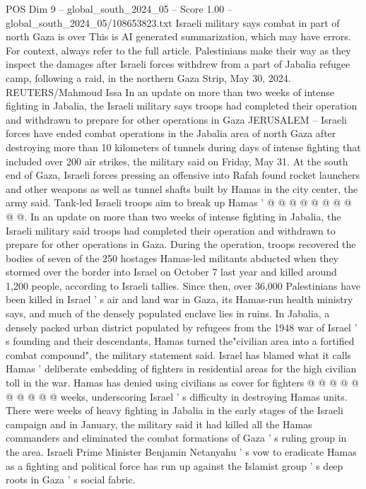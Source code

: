 \begin{textsample}{POS Dim 9 – global\_south\_2024\_05 – Score 1.00 – global\_south\_2024\_05/108653823.txt}  \label{ex:f9_pos_122}
Israeli military says combat in part of north Gaza is over This is AI generated summarization, which may have errors.
For context, always refer to the full article.
Palestinians make their way as they inspect the damages after Israeli forces withdrew from a part of Jabalia refugee camp, following a raid, in the northern Gaza Strip, May 30, 2024.
REUTERS/Mahmoud Issa In an update on more than two weeks of intense fighting in Jabalia, the Israeli military says troops had completed their operation and withdrawn to prepare for other operations in Gaza JERUSALEM -- Israeli forces have ended combat operations in the Jabalia area of north Gaza after destroying more than 10 kilometers of tunnels during days of intense fighting that included over 200 air strikes, the military said on Friday, May 31.
At the south end of Gaza, Israeli forces pressing an offensive into Rafah found rocket launchers and other weapons as well as tunnel shafts built by Hamas in the city center, the army said.
Tank-led Israeli troops aim to break up Hamas ' @ @ @ @ @ @ @ @ @ @.
In an update on more than two weeks of intense fighting in Jabalia, the Israeli military said troops had completed their operation and withdrawn to prepare for other operations in Gaza.
During the operation, troops recovered the bodies of seven of the 250 hostages Hamas-led militants abducted when they stormed over the border into Israel on October 7 last year and killed around 1,200 people, according to Israeli tallies.
Since then, over 36,000 Palestinians have been killed in Israel ' s air and land war in Gaza, its Hamas-run health ministry says, and much of the densely populated enclave lies in ruins.
In Jabalia, a densely packed urban district populated by refugees from the 1948 war of Israel ' s founding and their descendants, Hamas turned the"civilian area into a fortified combat compound", the military statement said.
Israel has blamed what it calls Hamas ' deliberate embedding of fighters in residential areas for the high civilian toll in the war.
Hamas has denied using civilians as cover for fighters @ @ @ @ @ @ @ @ @ @ weeks, underscoring Israel ' s difficulty in destroying Hamas units.
There were weeks of heavy fighting in Jabalia in the early stages of the Israeli campaign and in January, the military said it had killed all the Hamas commanders and eliminated the combat formations of Gaza ' s ruling group in the area.
Israeli Prime Minister Benjamin Netanyahu ' s vow to eradicate Hamas as a fighting and political force has run up against the Islamist group ' s deep roots in Gaza ' s social fabric.

\end{textsample}
